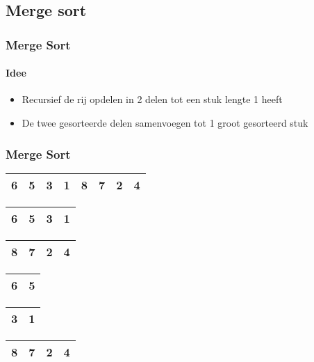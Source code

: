 \subsection[Merge]{Merge sort}

\begin{frame}
\frametitle{Merge Sort}
\framesubtitle{Idee}
\begin{itemize}
\item Recursief de rij opdelen in 2 delen tot een stuk lengte 1 heeft
\item De twee gesorteerde delen samenvoegen tot 1 groot gesorteerd stuk
\end{itemize}
\end{frame}

\begin{frame}
\frametitle{Merge Sort}
\begin{table}
\begin{tabular}{| c | c | c | c | c | c | c | c |}
\hline
\cellcolor{blue!25}6 & \cellcolor{blue!25}5 & \cellcolor{blue!25}3 & \cellcolor{blue!25}1 & \cellcolor{blue!25}8 & \cellcolor{blue!25}7 & \cellcolor{blue!25}2 & \cellcolor{blue!25}4 \\ 
\hline
\end{tabular}
\end{table}

\begin{table}
\begin{tabular}{| c | c | c | c |}
\hline
\cellcolor{blue!25}6 & \cellcolor{blue!25}5 & \cellcolor{blue!25}3 & \cellcolor{blue!25}1 \\ 
\hline
\end{tabular}
\quad
\begin{tabular}{| c | c | c | c |}
\hline
8 & 7 & 2 & 4 \\ 
\hline
\end{tabular}
\end{table}

\begin{table}
\begin{tabular}{| c | c |}
\hline
\cellcolor{blue!25}6 & \cellcolor{blue!25}5 \\ 
\hline
\end{tabular}
\quad
\begin{tabular}{| c | c |}
\hline
3 & 1 \\ 
\hline
\end{tabular}
\quad
\begin{tabular}{| c | c | c | c |}
\hline
8 & 7 & 2 & 4 \\ 
\hline
\end{tabular}
\end{table}


\end{frame}

